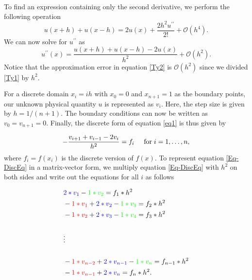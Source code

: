 \documentclass[a4paper]{article}
\begin{document}
To find an expression containing only the second derivative, we perform the following operation
\begin{equation}
 u(x+h)+u(x-h) = 2u(x) + \frac{2h^2u^{\prime\prime}}{2!} + \mathcal{O}(h^4).
 \label{Ty1}
\end{equation}
We can now solve for $u^{\prime\prime}$ as
\begin{equation}
  u^{\prime\prime}(x) = \frac{u(x+h)+u(x-h)-2u(x)}{h^2} + \mathcal{O}(h^2).
\label{Ty2}
\end{equation}
Notice that the approximation error in equation \eqref{Ty2} is $\mathcal{O}(h^2)$ since we divided \eqref{Ty1} by $h^2$.

For a discrete domain  $x_i=ih$ with $x_0=0$ and $x_{n+1}=1$ as the boundary points, our unknown physical quantity $u$ is represented as $v_i$. Here, the step size is given by $h=1/(n+1)$. The boundary conditions can now be written as $v_0 = v_{n+1} = 0$. Finally, the discrete form of equation \eqref{eq1} is thus given by

\begin{equation}
   -\frac{v_{i+1}+v_{i-1}-2v_i}{h^2} = f_i  \hspace{0.5cm} \mathrm{for} \hspace{0.1cm} i=1,\dots, n,
\label{Eq-DiscEq}
\end{equation}
where $f_i=f(x_i)$ is the discrete version of $f(x)$. To represent equation \eqref{Eq-DiscEq} in a matrix-vector form, we multiply equation \eqref{Eq-DiscEq} with $h^2$ on both sides and write out the equations for all $i$ as follows

\begin{align}
& \color{blue}2*v_1\color{black} - \color{green}1*v_2\color{black} = f_1*h^2\nonumber  \\
&  -\color{red}1*v_1\color{black} + \color{blue}2*v_2\color{black} - \color{green}1*v_3\color{black} = f_2*h^2\nonumber \\
& - \color{red}1*v_2\color{black} + \color{blue}2*v_3\color{black} - \color{green}1*v_4\color{black} = f_3*h^2\nonumber \\ \nonumber\\
  &\vdots \nonumber \\ \nonumber\\
& -\color{red}1*v_{n-2}\color{black} + \color{blue}2*v_{n-1}\color{black} - \color{green}1*v_n\color{black} = f_{n-1}*h^2 \nonumber \\
&  -  \color{red}1*v_{n-1}\color{black} + \color{blue}2*v_n\color{black} = f_n*h^2. 
\label{eq_i}
\end{align}
\end{document}
